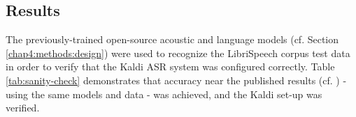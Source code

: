 






\subsection{Results}
\label{chap4:results}

The previously-trained open-source acoustic and language models (cf. Section \ref{chap4:methods:design}) were used to recognize the LibriSpeech corpus test data in order to verify that the Kaldi ASR system was configured correctly.  Table \ref{tab:sanity-check} demonstrates that accuracy near the published results (cf. \cite{panayotov:15}) - using the same models and data - was achieved, and the Kaldi set-up was verified.

